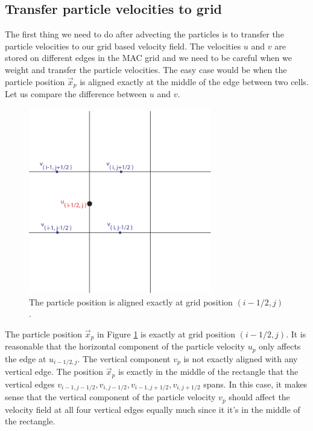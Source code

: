 \subsection{Transfer particle velocities to grid}

The first thing we need to do after advecting the particles is to transfer the particle velocities to our grid based velocity field.  The velocities $u$ and $v$ are stored on different edges in the MAC grid and we need to be careful when we weight and transfer the particle velocities. The easy case would be when the particle position $\vec{x}_p$ is aligned exactly at the middle of the edge between two cells. Let us compare the difference between $u$ and $v$. 

\begin{figure}[ht!]
\centering
\includegraphics[width=80mm]{img/transfer1.pdf}
\caption{The particle position is aligned exactly at grid position $(i-1/2,j)$.}
\label{onedge}
\end{figure}
\noindent
The particle position $\vec{x}_p$ in Figure \ref{onedge} is exactly at grid position $(i-1/2,j)$. It is reasonable that the horizontal component of the particle velocity $u_p$ only affects the edge at $u_{i-1/2,j}$. The vertical component $v_p$ is not exactly aligned with any vertical edge. The position $\vec{x}_p$ is exactly in the middle of the rectangle that the vertical edges $v_{i-1,j-1/2}, v_{i,j-1/2}, v_{i-1,j+1/2}, v_{i,j+1/2} $ spans. In this case, it makes sense that the vertical component of the particle velocity $v_p$ should affect the velocity field at all four vertical edges equally much since it it's in the middle of the rectangle. 
